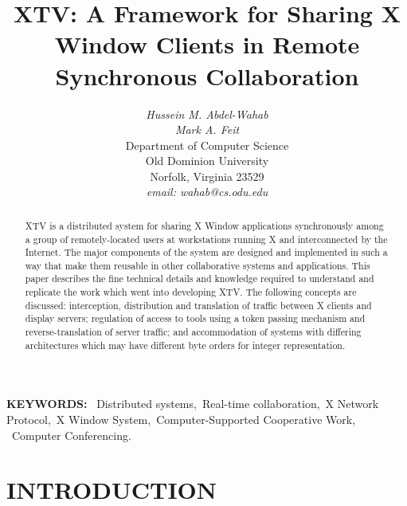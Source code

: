 \pagestyle{empty}

\addtolength{\textheight}{1.7in}
\addtolength{\textwidth}{1.1in}
\addtolength{\columnsep}{0.3in}
\setlength{\oddsidemargin}{-0.1in}
\setlength{\evensidemargin}{-0.1in}
\setlength{\topmargin}{-0.5in}
\title{ XTV: A Framework for Sharing X Window Clients in  Remote Synchronous Collaboration}
\author{ 
{\it Hussein M. Abdel-Wahab}
\\
{\it Mark A. Feit}
\\[.5cm]
Department of Computer Science\\
Old Dominion University\\
Norfolk, Virginia 23529\\[.3cm]
{\it email: wahab@cs.odu.edu}
}
\date{}

\pagestyle{empty}
\maketitle
\begin{abstract}
XTV is a distributed system for sharing X Window applications
synchronously among a group of remotely-located users at workstations
running X and interconnected by the Internet.  The major components of
the system are designed and implemented in such a way that make them
reusable in other collaborative systems and applications.  This paper
describes the fine technical details and knowledge required to
understand and replicate the work which went into developing XTV. 
The following concepts are discussed:
interception, distribution and translation of traffic between X
clients and display servers;
regulation of access to tools using a token passing mechanism and
reverse-translation of server traffic; and
accommodation of systems with differing architectures which may
have different byte orders for integer representation.\\[.4cm]
\end{abstract}

\noindent
{\bf KEYWORDS:} \ Distributed systems,\ Real-time collaboration,\ X
Network Protocol,\ X Window System,\ Computer-Supported Cooperative
Work, \ Computer Conferencing.

\newpage
%
%
\section{INTRODUCTION}

